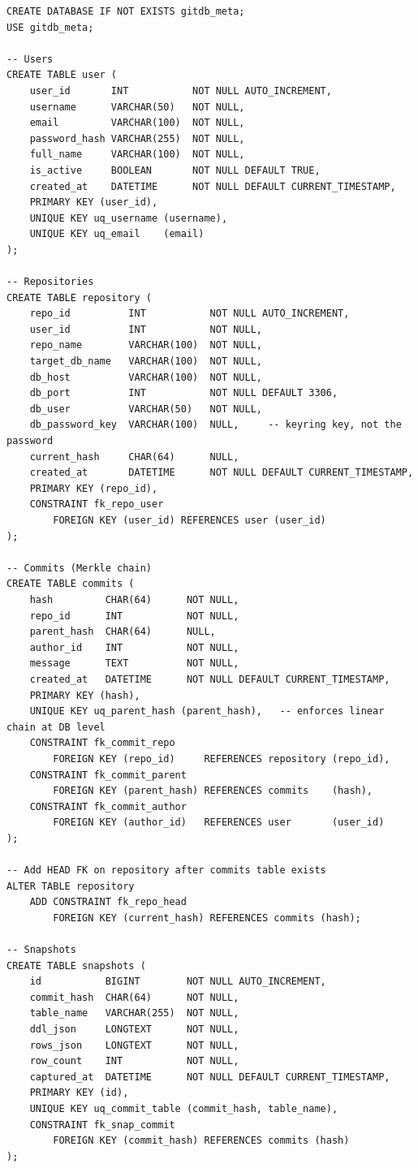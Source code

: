 \documentclass[12pt, a4paper]{article}
\begin{document}
\begin{lstlisting}[style=sqlstyle, caption={gitdb\_meta complete DDL}]
CREATE DATABASE IF NOT EXISTS gitdb_meta;
USE gitdb_meta;

-- Users
CREATE TABLE user (
    user_id       INT           NOT NULL AUTO_INCREMENT,
    username      VARCHAR(50)   NOT NULL,
    email         VARCHAR(100)  NOT NULL,
    password_hash VARCHAR(255)  NOT NULL,
    full_name     VARCHAR(100)  NOT NULL,
    is_active     BOOLEAN       NOT NULL DEFAULT TRUE,
    created_at    DATETIME      NOT NULL DEFAULT CURRENT_TIMESTAMP,
    PRIMARY KEY (user_id),
    UNIQUE KEY uq_username (username),
    UNIQUE KEY uq_email    (email)
);

-- Repositories
CREATE TABLE repository (
    repo_id          INT           NOT NULL AUTO_INCREMENT,
    user_id          INT           NOT NULL,
    repo_name        VARCHAR(100)  NOT NULL,
    target_db_name   VARCHAR(100)  NOT NULL,
    db_host          VARCHAR(100)  NOT NULL,
    db_port          INT           NOT NULL DEFAULT 3306,
    db_user          VARCHAR(50)   NOT NULL,
    db_password_key  VARCHAR(100)  NULL,     -- keyring key, not the password
    current_hash     CHAR(64)      NULL,
    created_at       DATETIME      NOT NULL DEFAULT CURRENT_TIMESTAMP,
    PRIMARY KEY (repo_id),
    CONSTRAINT fk_repo_user
        FOREIGN KEY (user_id) REFERENCES user (user_id)
);

-- Commits (Merkle chain)
CREATE TABLE commits (
    hash         CHAR(64)      NOT NULL,
    repo_id      INT           NOT NULL,
    parent_hash  CHAR(64)      NULL,
    author_id    INT           NOT NULL,
    message      TEXT          NOT NULL,
    created_at   DATETIME      NOT NULL DEFAULT CURRENT_TIMESTAMP,
    PRIMARY KEY (hash),
    UNIQUE KEY uq_parent_hash (parent_hash),   -- enforces linear chain at DB level
    CONSTRAINT fk_commit_repo
        FOREIGN KEY (repo_id)     REFERENCES repository (repo_id),
    CONSTRAINT fk_commit_parent
        FOREIGN KEY (parent_hash) REFERENCES commits    (hash),
    CONSTRAINT fk_commit_author
        FOREIGN KEY (author_id)   REFERENCES user       (user_id)
);

-- Add HEAD FK on repository after commits table exists
ALTER TABLE repository
    ADD CONSTRAINT fk_repo_head
        FOREIGN KEY (current_hash) REFERENCES commits (hash);

-- Snapshots
CREATE TABLE snapshots (
    id           BIGINT        NOT NULL AUTO_INCREMENT,
    commit_hash  CHAR(64)      NOT NULL,
    table_name   VARCHAR(255)  NOT NULL,
    ddl_json     LONGTEXT      NOT NULL,
    rows_json    LONGTEXT      NOT NULL,
    row_count    INT           NOT NULL,
    captured_at  DATETIME      NOT NULL DEFAULT CURRENT_TIMESTAMP,
    PRIMARY KEY (id),
    UNIQUE KEY uq_commit_table (commit_hash, table_name),
    CONSTRAINT fk_snap_commit
        FOREIGN KEY (commit_hash) REFERENCES commits (hash)
);
\end{lstlisting}
\end{document}

